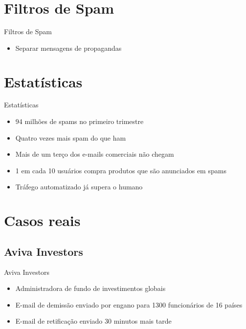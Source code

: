 \documentclass[dvipdfm]{beamer}
\begin{document}
\section{Filtros de Spam}
\begin{frame}{Filtros de Spam}
	\begin{itemize}
		\item Separar mensagens de propagandas
	\end{itemize}
\end{frame}

\section{Estatísticas}
\begin{frame}{Estatísticas}
	\begin{itemize}
		\item 94 milhões de spams no primeiro trimestre
		\item Quatro vezes mais spam do que ham
		\item Mais de um terço dos e-mails comerciais não chegam
		\item 1 em cada 10 usuários compra produtos que são anunciados em spams
		\item Tráfego automatizado já supera o humano
	\end{itemize}
\end{frame}

\section{Casos reais}
\subsection{Aviva Investors}
\begin{frame}{Aviva Investors}
	\begin{itemize}
		\item Administradora de fundo de investimentos globais
		\item E-mail de demissão enviado por engano para 1300 funcionários de 16 países
		\linebreak
		\item E-mail de retificação enviado 30 minutos mais tarde
	\end{itemize}
\end{frame}
\end{document}
